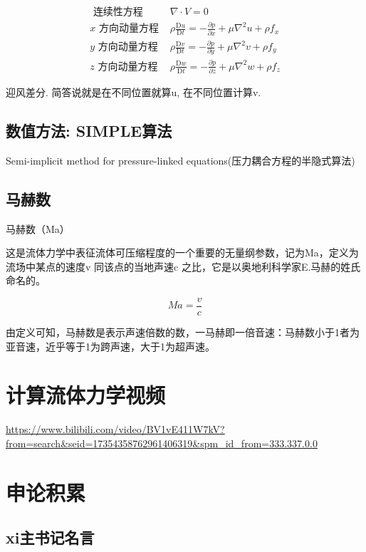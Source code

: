 \documentclass[UTF8]{ctexart}
\begin{document}
$$
	\begin{array}{|lc|}
		\hline \text { 连续性方程 } & \nabla \cdot V=0                                                                                  \\
		x \text { 方向动量方程 }    & \rho \frac{\mathrm{D} u}{\mathrm{D} t}=-\frac{\partial p}{\partial x}+\mu \nabla^{2} u+\rho f_{x} \\
		y \text { 方向动量方程 }    & \rho \frac{\mathrm{D} v}{\mathrm{D} t}=-\frac{\partial p}{\partial y}+\mu \nabla^{2} v+\rho f_{y} \\
		z \text { 方向动量方程 }    & \rho \frac{\mathrm{D} w}{\mathrm{D} t}=-\frac{\partial p}{\partial z}+\mu \nabla^{2} w+\rho f_{z}
	\end{array}
$$

迎风差分. 简答说就是在不同位置就算u, 在不同位置计算v.

\subsection{数值方法: SIMPLE算法}
Semi-implicit method for pressure-linked equations(压力耦合方程的半隐式算法)


\subsection{马赫数}
马赫数（Ma）

这是流体力学中表征流体可压缩程度的一个重要的无量纲参数，记为Ma，定义为流场中某点的速度v 同该点的当地声速c 之比，它是以奥地利科学家E.马赫的姓氏命名的。

$$
	Ma = \frac{v}{c}
$$

由定义可知，马赫数是表示声速倍数的数，一马赫即一倍音速：马赫数小于1者为亚音速，近乎等于1为跨声速，大于1为超声速。

\section{计算流体力学视频}
\url{https://www.bilibili.com/video/BV1vE411W7kV?from=search&seid=17354358762961406319&spm_id_from=333.337.0.0}

\section{申论积累}

\subsection{xi主书记名言}
\end{document}
